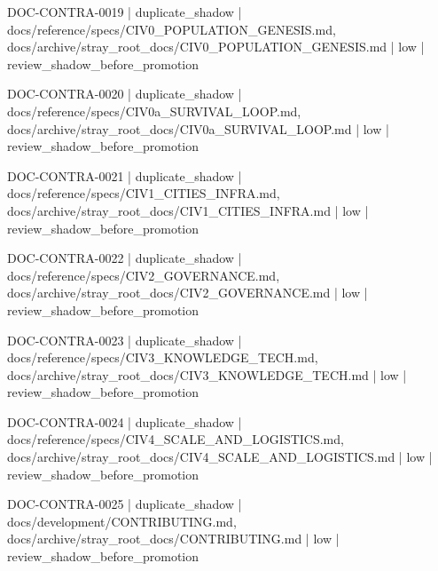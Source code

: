 \documentclass[11pt,a4paper]{report}
\begin{document}
{\small\ttfamily\raggedright DOC-\allowbreak{}CONTRA-\allowbreak{}0019 | duplicate\_shadow | docs/\allowbreak{}reference/\allowbreak{}specs/\allowbreak{}CIV0\_POPULATION\_GENESIS.\allowbreak{}md, docs/\allowbreak{}archive/\allowbreak{}stray\_root\_docs/\allowbreak{}CIV0\_POPULATION\_GENESIS.\allowbreak{}md | low | review\_shadow\_before\_promotion\par}
{\small\ttfamily\raggedright DOC-\allowbreak{}CONTRA-\allowbreak{}0020 | duplicate\_shadow | docs/\allowbreak{}reference/\allowbreak{}specs/\allowbreak{}CIV0a\_SURVIVAL\_LOOP.\allowbreak{}md, docs/\allowbreak{}archive/\allowbreak{}stray\_root\_docs/\allowbreak{}CIV0a\_SURVIVAL\_LOOP.\allowbreak{}md | low | review\_shadow\_before\_promotion\par}
{\small\ttfamily\raggedright DOC-\allowbreak{}CONTRA-\allowbreak{}0021 | duplicate\_shadow | docs/\allowbreak{}reference/\allowbreak{}specs/\allowbreak{}CIV1\_CITIES\_INFRA.\allowbreak{}md, docs/\allowbreak{}archive/\allowbreak{}stray\_root\_docs/\allowbreak{}CIV1\_CITIES\_INFRA.\allowbreak{}md | low | review\_shadow\_before\_promotion\par}
{\small\ttfamily\raggedright DOC-\allowbreak{}CONTRA-\allowbreak{}0022 | duplicate\_shadow | docs/\allowbreak{}reference/\allowbreak{}specs/\allowbreak{}CIV2\_GOVERNANCE.\allowbreak{}md, docs/\allowbreak{}archive/\allowbreak{}stray\_root\_docs/\allowbreak{}CIV2\_GOVERNANCE.\allowbreak{}md | low | review\_shadow\_before\_promotion\par}
{\small\ttfamily\raggedright DOC-\allowbreak{}CONTRA-\allowbreak{}0023 | duplicate\_shadow | docs/\allowbreak{}reference/\allowbreak{}specs/\allowbreak{}CIV3\_KNOWLEDGE\_TECH.\allowbreak{}md, docs/\allowbreak{}archive/\allowbreak{}stray\_root\_docs/\allowbreak{}CIV3\_KNOWLEDGE\_TECH.\allowbreak{}md | low | review\_shadow\_before\_promotion\par}
{\small\ttfamily\raggedright DOC-\allowbreak{}CONTRA-\allowbreak{}0024 | duplicate\_shadow | docs/\allowbreak{}reference/\allowbreak{}specs/\allowbreak{}CIV4\_SCALE\_AND\_LOGISTICS.\allowbreak{}md, docs/\allowbreak{}archive/\allowbreak{}stray\_root\_docs/\allowbreak{}CIV4\_SCALE\_AND\_LOGISTICS.\allowbreak{}md | low | review\_shadow\_before\_promotion\par}
{\small\ttfamily\raggedright DOC-\allowbreak{}CONTRA-\allowbreak{}0025 | duplicate\_shadow | docs/\allowbreak{}development/\allowbreak{}CONTRIBUTING.\allowbreak{}md, docs/\allowbreak{}archive/\allowbreak{}stray\_root\_docs/\allowbreak{}CONTRIBUTING.\allowbreak{}md | low | review\_shadow\_before\_promotion\par}
\end{document}
